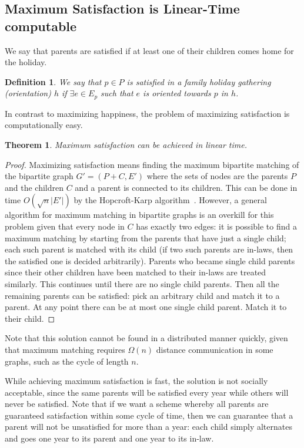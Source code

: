 \documentclass[11pt]{article}
\newtheorem{definition}{Definition}[section]
\newtheorem{theorem}{Theorem}[section]
\begin{document}
\subsection{Maximum Satisfaction is Linear-Time computable}\label{ss:sat}
We say that parents are satisfied if at least one of their  children
comes home for the holiday.
\begin{definition}
We say that  $p\in P$ is {\em satisfied in a family holiday
 gathering} (orientation) $h$ if $\exists e\in E_p$ such that $e$ is oriented towards $p$ in $h$.
\end{definition}

In contrast to maximizing happiness, the problem of maximizing satisfaction is computationally easy.

\begin{theorem}\label{t:bpm}
Maximum satisfaction can be achieved in linear time.
\end{theorem}

\begin{proof} Maximizing satisfaction means finding the maximum
bipartite matching of the bipartite graph $G'=(P+C, E')$ where the sets of nodes are the parents $P$ and the children $C$ and a parent is connected to its children. This can be done in time
$O(\sqrt{n}|E'|)$ by the Hopcroft-Karp algorithm~\cite{hk:73}. 
However, a general algorithm for maximum matching in bipartite graphs is an overkill for this problem given that every node in $C$ has exactly two edges: it is possible to find a maximum matching by starting from the parents that have just a single child; each such parent is matched with its child (if two such parents are in-laws, then the satisfied one is decided arbitrarily). Parents who became single child parents since their other children have been matched to their in-laws are treated similarly.
This continues until there are no single child parents. Then all the remaining parents can be satisfied: pick an arbitrary child and match it to a parent. At any point there can be at most one single child parent. Match it to their child.
 \end{proof}

Note that this solution cannot  be found in a distributed manner quickly, given that maximum matching requires $\Omega(n)$ distance communication in some graphs, such as the cycle of length $n$.

While achieving maximum satisfaction is fast, the solution is not
socially acceptable, since the same parents will be satisfied every
year while others will never be satisfied.
Note that if we want a scheme whereby all parents are guaranteed satisfaction within some cycle of time, then we can guarantee that a parent will not be unsatisfied for more than a year: each child simply alternates and goes one year to its parent and one year to its in-law.
\end{document}
